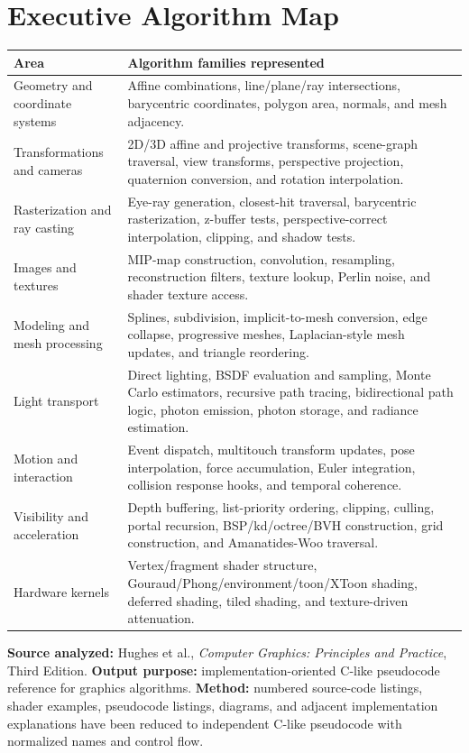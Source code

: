 \documentclass[10pt,letterpaper]{article}
\begin{document}
\section*{Executive Algorithm Map}
\begin{longtable}{>{\raggedright\arraybackslash}p{}>{\raggedright\arraybackslash}p{}}
\toprule
\textbf{Area} & \textbf{Algorithm families represented}\\
\midrule
Geometry and coordinate systems & Affine combinations, line/plane/ray intersections, barycentric coordinates, polygon area, normals, and mesh adjacency.\\
Transformations and cameras & 2D/3D affine and projective transforms, scene-graph traversal, view transforms, perspective projection, quaternion conversion, and rotation interpolation.\\
Rasterization and ray casting & Eye-ray generation, closest-hit traversal, barycentric rasterization, z-buffer tests, perspective-correct interpolation, clipping, and shadow tests.\\
Images and textures & MIP-map construction, convolution, resampling, reconstruction filters, texture lookup, Perlin noise, and shader texture access.\\
Modeling and mesh processing & Splines, subdivision, implicit-to-mesh conversion, edge collapse, progressive meshes, Laplacian-style mesh updates, and triangle reordering.\\
Light transport & Direct lighting, BSDF evaluation and sampling, Monte Carlo estimators, recursive path tracing, bidirectional path logic, photon emission, photon storage, and radiance estimation.\\
Motion and interaction & Event dispatch, multitouch transform updates, pose interpolation, force accumulation, Euler integration, collision response hooks, and temporal coherence.\\
Visibility and acceleration & Depth buffering, list-priority ordering, clipping, culling, portal recursion, BSP/kd/octree/BVH construction, grid construction, and Amanatides-Woo traversal.\\
Hardware kernels & Vertex/fragment shader structure, Gouraud/Phong/environment/toon/XToon shading, deferred shading, tiled shading, and texture-driven attenuation.\\
\bottomrule
\end{longtable}

\textbf{Source analyzed:} Hughes et al., \emph{Computer Graphics: Principles and Practice}, Third Edition. \textbf{Output purpose:} implementation-oriented C-like pseudocode reference for graphics algorithms. \textbf{Method:} numbered source-code listings, shader examples, pseudocode listings, diagrams, and adjacent implementation explanations have been reduced to independent C-like pseudocode with normalized names and control flow.
\end{document}
